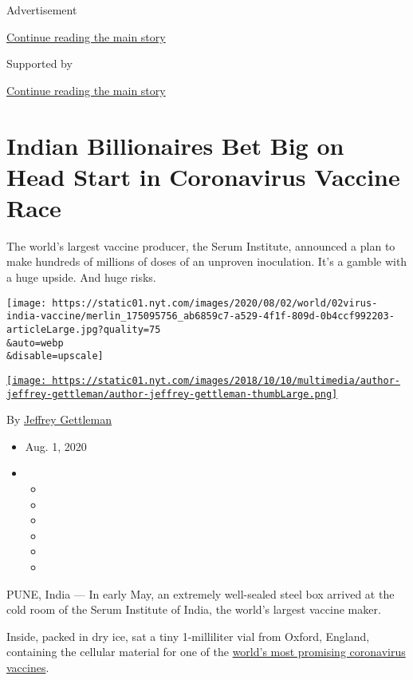 Advertisement

\protect\hyperlink{after-top}{Continue reading the main story}

Supported by

\protect\hyperlink{after-sponsor}{Continue reading the main story}

\hypertarget{indian-billionaires-bet-big-on-head-start-in-coronavirus-vaccine-race}{%
\section{Indian Billionaires Bet Big on Head Start in Coronavirus
Vaccine
Race}\label{indian-billionaires-bet-big-on-head-start-in-coronavirus-vaccine-race}}

The world's largest vaccine producer, the Serum Institute, announced a
plan to make hundreds of millions of doses of an unproven inoculation.
It's a gamble with a huge upside. And huge risks.

\texttt{[image: https://static01.nyt.com/images/2020/08/02/world/02virus-india-vaccine/merlin\_175095756\_ab6859c7-a529-4f1f-809d-0b4ccf992203-articleLarge.jpg?quality=75\\\&auto=webp\\\&disable=upscale]}

\href{https://www.nytimes.com/by/jeffrey-gettleman}{\texttt{[image: https://static01.nyt.com/images/2018/10/10/multimedia/author-jeffrey-gettleman/author-jeffrey-gettleman-thumbLarge.png]}}

By \href{https://www.nytimes.com/by/jeffrey-gettleman}{Jeffrey
Gettleman}

\begin{itemize}
\item
  Aug. 1, 2020
\item
  \begin{itemize}
  \item
  \item
  \item
  \item
  \item
  \item
  \end{itemize}
\end{itemize}

PUNE, India --- In early May, an extremely well-sealed steel box arrived
at the cold room of the Serum Institute of India, the world's largest
vaccine maker.

Inside, packed in dry ice, sat a tiny 1-milliliter vial from Oxford,
England, containing the cellular material for one of the
\href{https://www.nytimes.com/2020/04/27/world/europe/coronavirus-vaccine-update-oxford.html}{world's
most promising coronavirus vaccines}.

